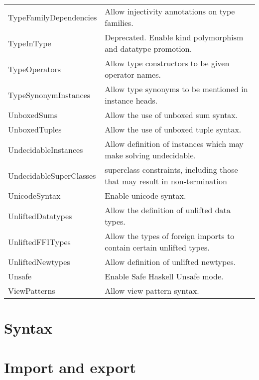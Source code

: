 \documentclass[openany, 12pt]{book}
\begin{document}
\begin{center}
\begin{supertabular}{ll}
		TypeFamilyDependencies     & Allow injectivity annotations on type families.                            \\
		TypeInType                 & Deprecated. Enable kind polymorphism and datatype promotion.               \\
		TypeOperators              & Allow type constructors to be given operator names.                        \\
		TypeSynonymInstances       & Allow type synonyms to be mentioned in instance heads.                     \\
		UnboxedSums                & Allow the use of unboxed sum syntax.                                       \\
		UnboxedTuples              & Allow the use of unboxed tuple syntax.                                     \\
		UndecidableInstances       & Allow definition of instances which may make solving undecidable.          \\
		UndecidableSuperClasses    & superclass constraints, including those that may result in non-termination \\
		UnicodeSyntax              & Enable unicode syntax.                                                     \\
		UnliftedDatatypes          & Allow the definition of unlifted data types.                               \\
		UnliftedFFITypes           & Allow the types of foreign imports to contain certain unlifted types.      \\
		UnliftedNewtypes           & Allow definition of unlifted newtypes.                                     \\
		Unsafe                     & Enable Safe Haskell Unsafe mode.                                           \\
		ViewPatterns               & Allow view pattern syntax.                                                 \\
		\bottomrule
	\end{supertabular}
\end{center}

\part{Syntax}
\part{Import and export}
\end{document}
